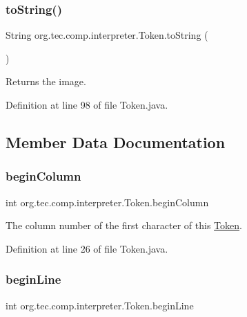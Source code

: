 \subsubsection{\texorpdfstring{to\+String()}{toString()}}
{\footnotesize\ttfamily String org.\+tec.\+comp.\+interpreter.\+Token.\+to\+String (\begin{DoxyParamCaption}{ }\end{DoxyParamCaption})\hspace{0.3cm}{\ttfamily [inline]}}

Returns the image. 

Definition at line 98 of file Token.\+java.



\subsection{Member Data Documentation}
\mbox{\label{classorg_1_1tec_1_1comp_1_1interpreter_1_1_token_a4477915d17fec02b320c93fb1ca5dc8c}} 
\subsubsection{\texorpdfstring{begin\+Column}{beginColumn}}
{\footnotesize\ttfamily int org.\+tec.\+comp.\+interpreter.\+Token.\+begin\+Column}

The column number of the first character of this \mbox{\hyperlink{classorg_1_1tec_1_1comp_1_1interpreter_1_1_token}{Token}}. 

Definition at line 26 of file Token.\+java.

\mbox{\label{classorg_1_1tec_1_1comp_1_1interpreter_1_1_token_a0bc93f1911779e85bcd851a086d16c61}} 
\subsubsection{\texorpdfstring{begin\+Line}{beginLine}}
{\footnotesize\ttfamily int org.\+tec.\+comp.\+interpreter.\+Token.\+begin\+Line}

